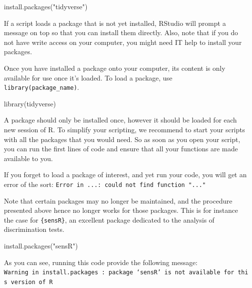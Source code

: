 \documentclass[
]{krantz}
\makeatletter
\newenvironment{Shaded}{\begin{snugshade}}{\end{snugshade}}
\newcommand{\FunctionTok}[1]{\textcolor[rgb]{0,0,0}{#1}}
\newcommand{\NormalTok}[1]{#1}
\newcommand{\StringTok}[1]{\textcolor[rgb]{0.5,0.5,0.5}{#1}}
\renewenvironment{quote}{\begin{VF}}{\end{VF}}
\newenvironment{kframe}{%
\medskip{}
\setlength{\fboxsep}{.8em}
 \def\at@end@of@kframe{}%
 \ifinner\ifhmode%
  \def\at@end@of@kframe{\end{minipage}}%
  \begin{minipage}{\columnwidth}%
 \fi\fi%
 \def\FrameCommand##1{\hskip\@totalleftmargin \hskip-\fboxsep
 \colorbox{shadecolor}{##1}\hskip-\fboxsep
     \hskip-\linewidth \hskip-\@totalleftmargin \hskip\columnwidth}%
 \MakeFramed {\advance\hsize-\width
   \@totalleftmargin\z@ \linewidth\hsize
   \@setminipage}}%
 {\par\unskip\endMakeFramed%
 \at@end@of@kframe}
\renewenvironment{Shaded}{\begin{kframe}}{\end{kframe}}
\makeatother
\begin{document}
\begin{Shaded}
\begin{Highlighting}[]
\FunctionTok{install.packages}\NormalTok{(}\StringTok{"tidyverse"}\NormalTok{)}
\end{Highlighting}
\end{Shaded}

\begin{quote}
If a script loads a package that is not yet installed, RStudio will prompt a message on top so that you can install them directly. Also, note that if you do not have write access on your computer, you might need IT help to install your packages.
\end{quote}

Once you have installed a package onto your computer, its content is only available for use once it's loaded. To load a package, use \texttt{library(package\_name)}.

\begin{Shaded}
\begin{Highlighting}[]
\FunctionTok{library}\NormalTok{(tidyverse)}
\end{Highlighting}
\end{Shaded}

A package should only be installed once, however it should be loaded for each new session of R. To simplify your scripting, we recommend to start your scripts with all the packages that you would need. So as soon as you open your script, you can run the first lines of code and ensure that all your functions are made available to you.

If you forget to load a package of interest, and yet run your code, you will get an error of the sort: \texttt{Error\ in\ ...:\ could\ not\ find\ function\ "..."}

Note that certain packages may no longer be maintained, and the procedure presented above hence no longer works for those packages. This is for instance the case for \texttt{\{sensR\}}, an excellent package dedicated to the analysis of discrimination tests.

\begin{Shaded}
\begin{Highlighting}[]
\FunctionTok{install.packages}\NormalTok{(}\StringTok{"sensR"}\NormalTok{)}
\end{Highlighting}
\end{Shaded}

As you can see, running this code provide the following message: \texttt{Warning\ in\ install.packages\ :\ package\ ‘sensR’\ is\ not\ available\ for\ this\ version\ of\ R}
\end{document}
